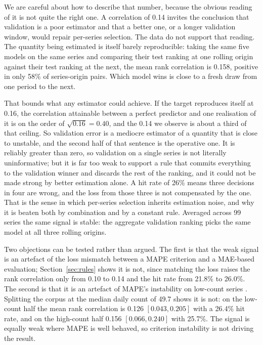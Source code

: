 \documentclass[11pt]{article}
\begin{document}
We are careful about how to describe that number, because the obvious reading of it is not quite the right one. A correlation of 0.14 invites the conclusion that validation is a poor estimator and that a better one, or a longer validation window, would repair per-series selection. The data do not support that reading. The quantity being estimated is itself barely reproducible: taking the same five models on the same series and comparing their test ranking at one rolling origin against their test ranking at the next, the mean rank correlation is 0.158, positive in only 58\% of series-origin pairs. Which model wins is close to a fresh draw from one period to the next.

That bounds what any estimator could achieve. If the target reproduces itself at 0.16, the correlation attainable between a perfect predictor and one realisation of it is on the order of $\sqrt{0.16} = 0.40$, and the 0.14 we observe is about a third of that ceiling. So validation error is a mediocre estimator of a quantity that is close to unstable, and the second half of that sentence is the operative one. It is reliably greater than zero, so validation on a single series is not literally uninformative; but it is far too weak to support a rule that commits everything to the validation winner and discards the rest of the ranking, and it could not be made strong by better estimation alone. A hit rate of 26\% means three decisions in four are wrong, and the loss from those three is not compensated by the one. That is the sense in which per-series selection inherits estimation noise, and why it is beaten both by combination and by a constant rule. Averaged across 99 series the same signal is stable: the aggregate validation ranking picks the same model at all three rolling origins.

Two objections can be tested rather than argued. The first is that the weak signal is an artefact of the loss mismatch between a MAPE criterion and a MAE-based evaluation; Section~\ref{sec:rules} shows it is not, since matching the loss raises the rank correlation only from 0.10 to 0.14 and the hit rate from 21.8\% to 26.0\%. The second is that it is an artefact of MAPE's instability on low-count series \citep{kolassa2016}. Splitting the corpus at the median daily count of 49.7 shows it is not: on the low-count half the mean rank correlation is 0.126 $[0.043, 0.205]$ with a 26.4\% hit rate, and on the high-count half 0.156 $[0.066, 0.240]$ with 25.7\%. The signal is equally weak where MAPE is well behaved, so criterion instability is not driving the result.
\end{document}
